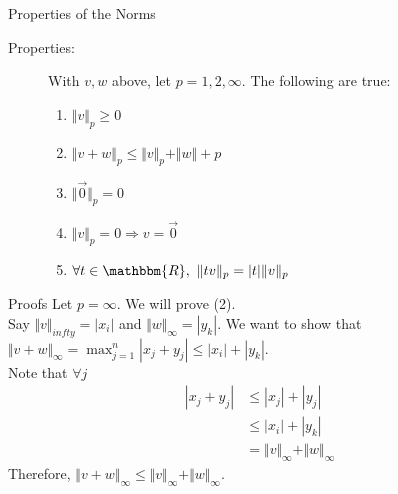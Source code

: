\documentclass[10pt]{extarticle}
\newcommand{\R}{\mathbbm{R}}
\begin{document}
  \begin{problem}{Properties of the Norms}
    \begin{description}
      \item[Properties:] With $v,w$  above, let $p = 1,2,\infty$. The following are true:
        \begin{enumerate}[(1)]
          \item $\Vert v\Vert_p \geq 0$
          \item $\Vert v+w \Vert_p \leq \Vert v\Vert_p + \Vert w \Vert+p$
          \item $\Vert \vec{0}\Vert_p = 0$
          \item $\Vert v\Vert_p = 0 \Rightarrow v = \vec{0}$
          \item $\forall t\in \R,~\Vert tv \Vert_{p} = |t| \Vert v \Vert_p$ 
        \end{enumerate}
    \end{description}
    \begin{problem}{Proofs}
      Let $p = \infty$. We will prove (2).\\

      Say $\Vert v \Vert_{infty} = |x_i|$ and $\Vert w \Vert_{\infty} = |y_k|$. We want to show that $\Vert v + w \Vert_{\infty} = \max_{j=1}^{n}|x_j + y_j| \leq |x_i| + |y_k|$.\\

      Note that $\forall j$
      \begin{align*}
        |x_j + y_j| &\leq |x_j| + |y_j| \tag*{Triangle Inequality}\\
                    &\leq |x_i| + |y_k| \\
                    &= \Vert v \Vert_{\infty} + \Vert w \Vert_{\infty}
      \end{align*}
      Therefore, $\Vert v + w \Vert_{\infty} \leq \Vert v \Vert_{\infty} + \Vert w \Vert_{\infty}$.
    \end{problem}
  \end{problem}
\end{document}
